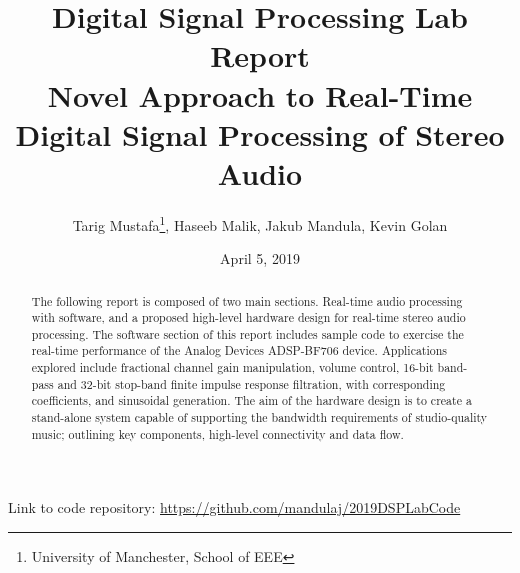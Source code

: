 \documentclass[a4paper, 12pt]{article} %
\title{
	\large{Digital Signal Processing Lab Report} \\
	\huge{Novel Approach to Real-Time Digital Signal Processing of Stereo Audio}
}
\date{April 5, 2019}
\author{Tarig Mustafa\thanks{University of Manchester, School of EEE}, Haseeb Malik\samethanks, Jakub Mandula\samethanks, Kevin Golan\samethanks}
\begin{document}
 



\maketitle


\begin{abstract}
The following report is composed of two main sections. Real-time audio processing with software, and a proposed high-level hardware design for real-time stereo audio processing. The software section of this report includes sample code to exercise the real-time performance of the Analog Devices ADSP-BF706 device. Applications explored include fractional channel gain manipulation, volume control, 16-bit band-pass and 32-bit stop-band finite impulse response filtration, with corresponding coefficients, and sinusoidal generation. The aim of the hardware design is to create a stand-alone system capable of supporting the bandwidth requirements of studio-quality music; outlining key components, high-level connectivity and data flow. 
\end{abstract}

\newpage

\tableofcontents

\newpage
 
 





\printbibliography
Link to code repository: \href{https://github.com/mandulaj/2019DSPLabCode}{https://github.com/mandulaj/2019DSPLabCode}
\end{document}

